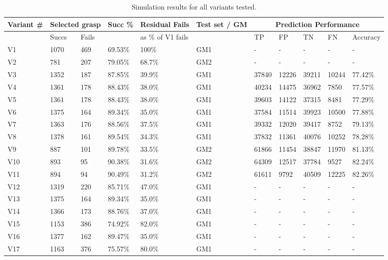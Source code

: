 \begin{table}[t]
\centering
\begin{tabular}{|l|l|l|l|l|l|l|l|l|l|l|}
\hline
Variant \# & \multicolumn{2}{|c|}{Selected grasp} &  Succ \% & Residual Fails & Test set / GM& \multicolumn{5}{|c|}{Prediction Performance} \\ \hline
 & Succs & Fails &  & as \% of V1 fails &  & TP & FP & TN & FN & Accuracy \\ \hline
V1 & 1070   & 469 & 69.53\% & 100\% & GM1 & - & - & - & - & - \\ \hline
V2 &  781   & 207 & 79.05\% & 68.7\% & GM2 & - & - & - & - & - \\ \hline
V3 & 1352 & 187 & 87.85\% & 39.9\% & GM1 & 37840 &	12226 & 39211 & 10244 & 77.42\% \\ \hline
V4 &  1361 & 178 & 88.43\% & 38.0\% & GM1 & 40234 &	14475 & 36962 & 7850 & 77.57\% \\ \hline

V5 & 1361 & 178 & 88.43\% & 38.0\%& GM1 & 39603 & 14122 &37315 & 8481	& 77.29\% \\ \hline

V6 & 1375 & 164 & 89.34\% & 35.0\% & GM1 & 37584 &	11514 & 39923 &10500	& 77.88\% \\ \hline
V7 & 1363 & 176 & 88.56\% & 37.5\% & GM1 & 39332 &	12020 & 39417 & 8752 & 79.13\% \\ \hline
V8 & 1378 & 161 & 89.54\% & 34.3\% & GM1 & 37832 &	11361 & 40076	& 10252 & 78.28\% \\ \hline
V9 & 887 & 101 & 89.78\% & 33.5\% & GM2 & 61866 &	11454& 38847& 11970 & 81.13\% \\ \hline
V10 & 893 & 95 & 90.38\% & 31.6\% & GM2 & 64309 &	12517 & 37784 & 9527 & 82.24\% \\ \hline
V11 & 894 & 94 & 90.49\% & 31.2\% & GM2 & 61611 & 9792 & 40509 & 12225 & 82.26\% \\ \hline
V12 & 1319 & 220 & 85.71\% & 47.0\% & GM1 & - & - & - & - & - \\ \hline
V13 & 1375 & 164 & 89.34\% & 35.0\% & GM1 & - & - & - & - & - \\ \hline
V14 & 1366 & 173 & 88.76\% & 37.0\% & GM1 & - & - & - & - & - \\ \hline
V15 & 1153 & 386 & 74.92\% & 82.0\% & GM1 & - & - & - & - & - \\ \hline
V16 & 1377 & 162 & 89.47\% & 35.0\% & GM1 & - & - & - & - & - \\ \hline
V17 & 1163 & 376 & 75.57\% & 80.0\% & GM1 & - & - & - & - & - \\ \hline
\end{tabular}
\caption{Simulation results for all variants tested.}
\label{table:Results-sim}
\end{table}
